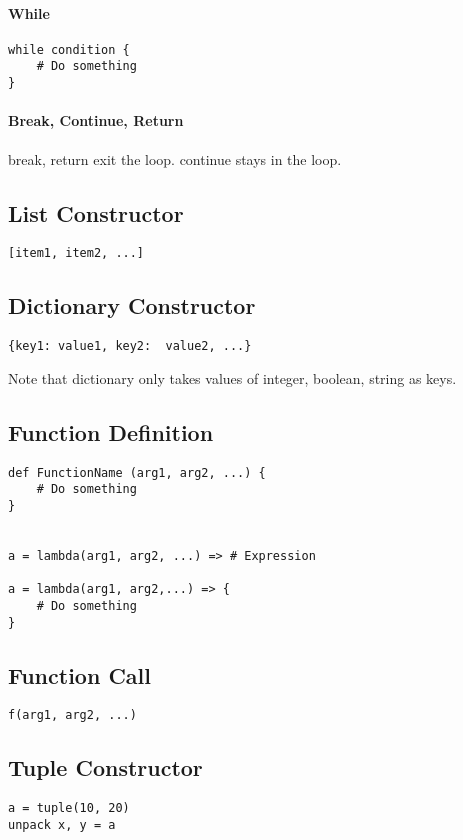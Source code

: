 \documentclass[]{article}
\begin{document}
\paragraph{While}
\begin{lstlisting}
while condition {
	# Do something
}
\end{lstlisting}

\paragraph{Break, Continue, Return}
break, return exit the loop. continue stays in the loop.

\subsection{List Constructor}
\begin{lstlisting}
[item1, item2, ...]
\end{lstlisting}


\subsection{Dictionary Constructor}
\begin{lstlisting}
{key1: value1, key2:  value2, ...}
\end{lstlisting}
Note that dictionary only takes values of integer, boolean, string as keys.

\subsection{Function Definition}
\begin{lstlisting}
def FunctionName (arg1, arg2, ...) {
	# Do something	
}


a = lambda(arg1, arg2, ...) => # Expression

a = lambda(arg1, arg2,...) => {
	# Do something
}
\end{lstlisting}
\subsection{Function Call}
\begin{lstlisting}
f(arg1, arg2, ...)
\end{lstlisting}

\subsection{Tuple Constructor}
\begin{lstlisting}
a = tuple(10, 20)
unpack x, y = a
\end{lstlisting}
\end{document}
